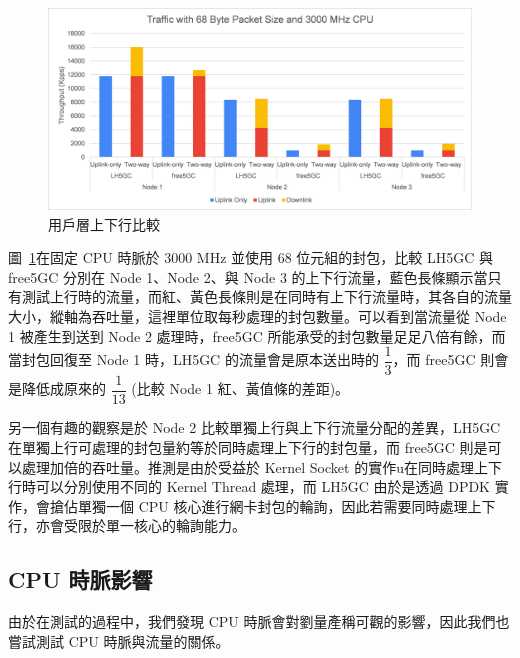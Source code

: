\begin{figure}[htb]
  \centering
  \includegraphics[height=!,width=1\linewidth,keepaspectratio=true]{figures/up_uldl_comp}
  \caption[用戶層上下行比較]{{\footnotesize 用戶層上下行比較}}
  \label{fig:up_uldl_comp}
\end{figure}

圖~\ref{fig:up_uldl_comp}在固定 CPU 時脈於 3000 MHz 並使用 68 位元組的封包，比較 LH5GC 與 free5GC 分別在 Node 1、Node 2、與 Node 3 的上下行流量，藍色長條顯示當只有測試上行時的流量，而紅、黃色長條則是在同時有上下行流量時，其各自的流量大小，縱軸為吞吐量，這裡單位取每秒處理的封包數量。可以看到當流量從 Node 1 被產生到送到 Node 2 處理時，free5GC 所能承受的封包數量足足八倍有餘，而當封包回復至 Node 1 時，LH5GC 的流量會是原本送出時的 $\dfrac{1}{3}$，而 free5GC 則會是降低成原來的 $\dfrac{1}{13}$ (比較 Node 1 紅、黃值條的差距)。

另一個有趣的觀察是於 Node 2 比較單獨上行與上下行流量分配的差異，LH5GC 在單獨上行可處理的封包量約等於同時處理上下行的封包量，而 free5GC 則是可以處理加倍的吞吐量。推測是由於受益於 Kernel Socket 的實作u在同時處理上下行時可以分別使用不同的 Kernel Thread 處理，而 LH5GC 由於是透過 DPDK 實作，會搶佔單獨一個 CPU 核心進行網卡封包的輪詢，因此若需要同時處理上下行，亦會受限於單一核心的輪詢能力。

\subsection{CPU 時脈影響}
\label{subsec:cpu_clock}

由於在測試的過程中，我們發現 CPU 時脈會對劉量產稱可觀的影響，因此我們也嘗試測試 CPU 時脈與流量的關係。

